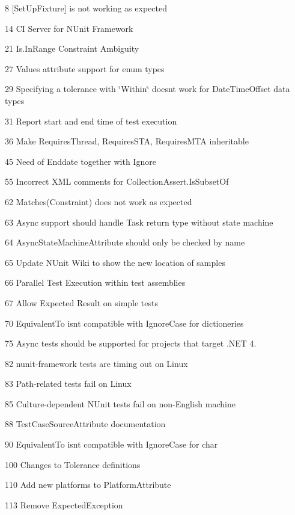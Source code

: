 \begin{DoxyItemize}
\item 8 \mbox{[}Set\+Up\+Fixture\mbox{]} is not working as expected
\item 14 CI Server for N\+Unit Framework
\item 21 Is.\+In\+Range Constraint Ambiguity
\item 27 Values attribute support for enum types
\item 29 Specifying a tolerance with \char`\"{}\+Within\char`\"{} doesn\textquotesingle{}t work for Date\+Time\+Offset data types
\item 31 Report start and end time of test execution
\item 36 Make Requires\+Thread, Requires\+S\+TA, Requires\+M\+TA inheritable
\item 45 Need of Enddate together with Ignore
\item 55 Incorrect X\+ML comments for Collection\+Assert.\+Is\+Subset\+Of
\item 62 Matches(\+Constraint) does not work as expected
\item 63 Async support should handle Task return type without state machine
\item 64 Async\+State\+Machine\+Attribute should only be checked by name
\item 65 Update N\+Unit Wiki to show the new location of samples
\item 66 Parallel Test Execution within test assemblies
\item 67 Allow Expected Result on simple tests
\item 70 Equivalent\+To isn\textquotesingle{}t compatible with Ignore\+Case for dictioneries
\item 75 Async tests should be supported for projects that target .N\+ET 4.
\item 82 nunit-\/framework tests are timing out on Linux
\item 83 Path-\/related tests fail on Linux
\item 85 Culture-\/dependent N\+Unit tests fail on non-\/\+English machine
\item 88 Test\+Case\+Source\+Attribute documentation
\item 90 Equivalent\+To isn\textquotesingle{}t compatible with Ignore\+Case for char
\item 100 Changes to Tolerance definitions
\item 110 Add new platforms to Platform\+Attribute
\item 113 Remove Expected\+Exception

\end{DoxyItemize}
